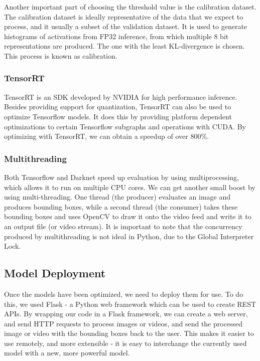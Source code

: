 \documentclass[12pt,letterpaper]{article}
\begin{document}
Another important part of choosing the threshold value is the calibration dataset. The calibration dataset is ideally representative of the data that we expect to process, and it usually a subset of the validation dataset. It is used to generate histograms of activations from FP32 inference, from which multiple 8 bit representations are produced. The one with the least KL-divergence is chosen. This process is known as calibration.

\subsubsection{TensorRT}

TensorRT is an SDK developed by NVIDIA for high performance inference. Besides providing support for quantization, TensorRT can also be used to optimize Tensorflow models. It does this by providing platform dependent optimizations to certain Tensorflow subgraphs and operations with CUDA. By optimizing with TensorRT, we can obtain a speedup of over 800\%.

\subsubsection{Multithreading}

Both Tensorflow and Darknet speed up evaluation by using multiprocessing, which allows it to run on multiple CPU cores. We can get another small boost by using multi-threading. One thread (the producer) evaluates an image and produces bounding boxes, while a second thread (the consumer) takes these bounding boxes and uses OpenCV to draw it onto the video feed and write it to an output file (or video stream). It is important to note that the concurrency produced by multithreading is not ideal in Python, due to the Global Interpreter Lock.

\subsection{Model Deployment}

Once the models have been optimized, we need to deploy them for use. To do this, we used Flask - a Python web framework which can be used to create REST APIs. By wrapping our code in a Flask framework, we can create a web server, and send HTTP requests to process images or videos, and send the processed image or video with the bounding boxes back to the user. This makes it easier to use remotely, and more extensible - it is easy to interchange the currently used model with a new, more powerful model.
\end{document}
